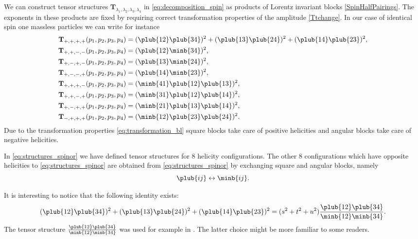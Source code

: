 We can construct tensor structures $\mathbf{T}_{\lambda_1, \lambda_2,\lambda_3,\lambda_4}$ in \eqref{eq:decomposition_spin} as products of Lorentz invariant blocks \eqref{SpinHalfPairings}. The exponents in these products are fixed by requiring correct transformation properties of the amplitude \eqref{Ttchange}. In our case of identical spin one massless particles we can write for instance
\begin{equation}
	\label{eq:structures_spinor}
	\begin{aligned}
		\mathbf{T}_{+,+,+,+}(p_1,p_2,p_3,p_4) &= (\plub{12}\plub{34})^2+(\plub{13}\plub{24})^2+(\plub{14}\plub{23})^2,\\
		\mathbf{T}_{+,+,-,-}(p_1,p_2,p_3,p_4) &=(\plub{12}\minb{34})^2,\\
		\mathbf{T}_{+,-,+,-}(p_1,p_2,p_3,p_4) &=(\plub{13}\minb{24})^2,\\
		\mathbf{T}_{+,-,-,+}(p_1,p_2,p_3,p_4) &=(\plub{14}\minb{23})^2,\\
		\mathbf{T}_{+,+,+,-}(p_1,p_2,p_3,p_4) &= (\minb{41}\plub{12}\plub{13})^2,\\
		\mathbf{T}_{+,+,-,+}(p_1,p_2,p_3,p_4) &= (\minb{31}\plub{12}\plub{14})^2,\\
		\mathbf{T}_{+,-,+,+}(p_1,p_2,p_3,p_4) &= (\minb{21}\plub{13}\plub{14})^2,\\
		\mathbf{T}_{-,+,+,+}(p_1,p_2,p_3,p_4) &= (\minb{12}\plub{23}\plub{24})^2.
	\end{aligned}
\end{equation}
Due to the transformation properties \eqref{eq:transformation_bl} square blocks take care of positive helicities and angular blocks take care of negative helicities.



In \eqref{eq:structures_spinor} we have defined tensor structures for 8 helicity configurations. The other 8 configurations which have opposite helicities to \eqref{eq:structures_spinor} are obtained from \eqref{eq:structures_spinor} by exchanging square and angular blocks, namely
\begin{equation}
	\plub{ij}  \leftrightarrow \minb{ij}.
\end{equation}

It is interesting to notice that the following identity exists:
\begin{equation}\label{eq:identity_spinor}
	(\plub{12}\plub{34})^2+(\plub{13}\plub{24})^2+(\plub{14}\plub{23})^2 = (s^2+t^2+u^2)\frac{\plub{12}\plub{34}}{\minb{12}\minb{34}}.
\end{equation}
The tensor structure $\frac{\plub{12}\plub{34}}{\minb{12}\minb{34}}$ was used for example in \cite{Arkani-Hamed:2020blm}. The latter choice might be more familiar to some readers. 



